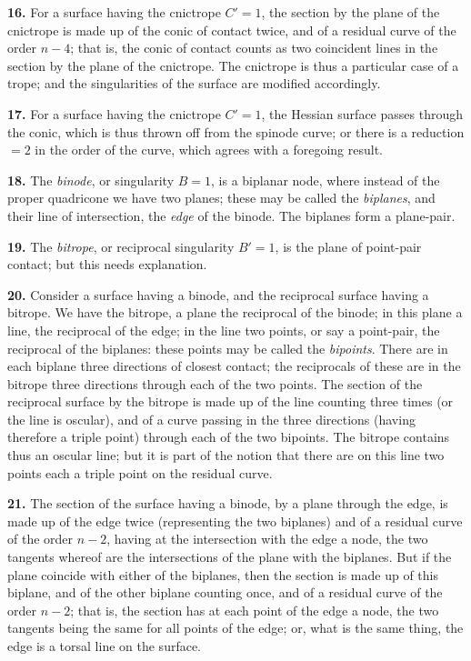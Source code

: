 \documentclass[11pt,a4paper]{article}
\begin{document}
\textbf{16.} For a surface having the cnictrope $C'=1$, the section by the plane of the cnictrope is made up of the conic of contact twice, and of a residual curve of the order $n-4$; that is, the conic of contact counts as two coincident lines in the section by the plane of the cnictrope. The cnictrope is thus a particular case of a trope; and the singularities of the surface are modified accordingly.

\textbf{17.} For a surface having the cnictrope $C'=1$, the Hessian surface passes through the conic, which is thus thrown off from the spinode curve; or there is a reduction $=2$ in the order of the curve, which agrees with a foregoing result.

\textbf{18.} The \textit{binode}, or singularity $B=1$, is a biplanar node, where instead of the proper quadricone we have two planes; these may be called the \textit{biplanes}, and their line of intersection, the \textit{edge} of the binode. The biplanes form a plane-pair.

\textbf{19.} The \textit{bitrope}, or reciprocal singularity $B'=1$, is the plane of point-pair contact; but this needs explanation.

\textbf{20.} Consider a surface having a binode, and the reciprocal surface having a bitrope. We have the bitrope, a plane the reciprocal of the binode; in this plane a line, the reciprocal of the edge; in the line two points, or say a point-pair, the reciprocal of the biplanes: these points may be called the \textit{bipoints}. There are in each biplane three directions of closest contact; the reciprocals of these are in the bitrope three directions through each of the two points. The section of the reciprocal surface by the bitrope is made up of the line counting three times (or the line is oscular), and of a curve passing in the three directions (having therefore a triple point) through each of the two bipoints. The bitrope contains thus an oscular line; but it is part of the notion that there are on this line two points each a triple point on the residual curve.

\textbf{21.} The section of the surface having a binode, by a plane through the edge, is made up of the edge twice (representing the two biplanes) and of a residual curve of the order $n-2$, having at the intersection with the edge a node, the two tangents whereof are the intersections of the plane with the biplanes. But if the plane coincide with either of the biplanes, then the section is made up of this biplane, and of the other biplane counting once, and of a residual curve of the order $n-2$; that is, the section has at each point of the edge a node, the two tangents being the same for all points of the edge; or, what is the same thing, the edge is a torsal line on the surface.
\end{document}
